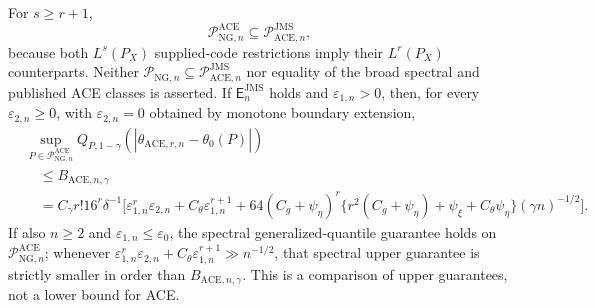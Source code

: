 For \(s\ge r+1\),
\[
 \mathcal P_{\mathrm{NG},n}^{\mathrm{ACE}}
 \subseteq\mathcal P_{\mathrm{ACE},n}^{\mathrm{JMS}},
\]
because both \(L^s(P_X)\) supplied-code restrictions imply their \(L^r(P_X)\) counterparts. Neither \(\mathcal P_{\mathrm{NG},n}\subseteq\mathcal P_{\mathrm{ACE},n}^{\mathrm{JMS}}\) nor equality of the broad spectral and published ACE classes is asserted. If \(\mathsf E_n^{\mathrm{JMS}}\) holds and \(\varepsilon_{1,n}>0\), then, for every \(\varepsilon_{2,n}\ge0\), with \(\varepsilon_{2,n}=0\) obtained by monotone boundary extension,
\[
\begin{aligned}
 &\sup_{P\in\mathcal P_{\mathrm{NG},n}^{\mathrm{ACE}}}
 Q_{P,1-\gamma}(|\widehat\theta_{\mathrm{ACE},r,n}-\theta_0(P)|)\\
 &\quad\le B_{\mathrm{ACE},n,\gamma}\\
 &\quad=C_{\gamma}r!16^r\delta^{-1}
 \Big[\varepsilon_{1,n}^r\varepsilon_{2,n}
 +C_{\theta}\varepsilon_{1,n}^{r+1}
 +64(C_g+\psi_{\eta})^r
 \{r^2(C_g+\psi_{\eta})+\psi_{\xi}+C_{\theta}\psi_{\eta}\}
 (\gamma n)^{-1/2}\Big].
\end{aligned}
\]
If also \(n\ge2\) and \(\varepsilon_{1,n}\le\varepsilon_0\), the spectral generalized-quantile guarantee holds on \(\mathcal P_{\mathrm{NG},n}^{\mathrm{ACE}}\); whenever \(\varepsilon_{1,n}^r\varepsilon_{2,n}+C_{\theta}\varepsilon_{1,n}^{r+1}\gg n^{-1/2}\), that spectral upper guarantee is strictly smaller in order than \(B_{\mathrm{ACE},n,\gamma}\). This is a comparison of upper guarantees, not a lower bound for ACE.
